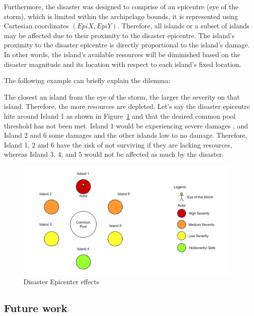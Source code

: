 Furthermore, the disaster was designed to comprise of an epicentre (eye of the storm), which is limited within the archipelago bounds, it is represented using Cartesian coordinates $(EpiX, EpiY)$. Therefore, all islands or a subset of islands may be affected due to their proximity to the disaster epicentre. The island’s proximity to the disaster epicentre is directly proportional to the island’s damage. In other words, the island's available resources will be diminished based on the disaster magnitude and its location with respect to each island’s fixed location.

The following example can briefly explain the dilemma:

The closest an island from the eye of the storm, the larger the severity on that island. Therefore, the more resources are depleted. Let’s say the disaster epicentre hits around Island 1 as shown in Figure~\ref{fig:Disaster eye of the storm severity} and that the desired common pool threshold has not been met. Island 1 would be experiencing severe damages , and Island 2 and 6 some damages and the other islands low to no damage. Therefore, Island 1, 2 and 6 have the risk of not surviving if they are lacking resources, whereas Island 3, 4, and 5 would not be affected as much by the disaster.

\begin{figure}[!htb]
    \centering
    \includegraphics[width=1\textwidth]{04_environment/images/Disaster eye of the storm severity.PNG}
    \caption{Disaster Epicenter effects}
    \label{fig:Disaster eye of the storm severity}
\end{figure}

\newpage
\subsection{Future work}

